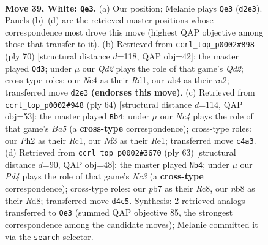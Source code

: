 \documentclass[11pt]{article}
\begin{document}
\clearpage

\begin{figure}[p]\centering
\begin{subfigure}{0.46\textwidth}\centering
\resizebox{\linewidth}{!}{%
\newchessgame
\chessboard[
  setfen={rnbr1q2/1p4k1/4p3/p1p2p1p/PnNP1P2/1P3NP1/3QB1KP/3R3R w - - 1 39},
  showmover=false,
  pgfstyle=straightmove, color=movearrow, markmove={d2-e3}
]}
\caption{}
\end{subfigure}\hfill
\begin{subfigure}{0.46\textwidth}\centering
\resizebox{\linewidth}{!}{%
\newchessgame
\chessboard[
  setfen={r5k1/2qn1pp1/1pb1p2p/2pP4/2P5/4PNP1/r2QBPP1/3RR1K1 w - - 11 36},
  showmover=false,
  pgfstyle=straightmove, color=movearrow, markmove={d2-d3}
]}
\caption{}
\end{subfigure}
\\[4pt]
\begin{subfigure}{0.46\textwidth}\centering
\resizebox{\linewidth}{!}{%
\newchessgame
\chessboard[
  setfen={4r1k1/1q1nbpp1/p3p2p/Bpr5/2P5/1P3N1P/P3QPP1/2R1R1K1 w - - 0 33},
  showmover=false,
  pgfstyle=straightmove, color=movearrow, markmove={a5-b4}
]}
\caption{}
\end{subfigure}\hfill
\begin{subfigure}{0.46\textwidth}\centering
\resizebox{\linewidth}{!}{%
\newchessgame
\chessboard[
  setfen={2rr2k1/1b2qpp1/1pn1p2p/pN1p4/P2P3P/4P1P1/1P3P2/1RRQ1BK1 b - - 1 32},
  showmover=false,
  pgfstyle=straightmove, color=movearrow, markmove={c6-b4}
]}
\caption{}
\end{subfigure}
\caption{\textbf{Move 39, White: \texttt{Qe3}.} (a) Our position; Melanie plays \texttt{Qe3} (\texttt{d2e3}). Panels (b)--(d) are the retrieved master positions whose correspondence most drove this move (highest QAP objective among those that transfer to it). (b) Retrieved from \texttt{ccrl\_top\_p0002\#898} (ply 70) [structural distance $d$=118, QAP obj=42]: the master played \texttt{Qd3}; under $\mu$ our \emph{Qd2} plays the role of that game's \emph{Qd2}; cross-type roles: our \emph{N}c4 as their \emph{R}d1, our \emph{n}b4 as their \emph{r}a2; transferred move \texttt{d2e3} \textbf{(endorses this move)}. (c) Retrieved from \texttt{ccrl\_top\_p0002\#948} (ply 64) [structural distance $d$=114, QAP obj=53]: the master played \texttt{Bb4}; under $\mu$ our \emph{Nc4} plays the role of that game's \emph{Ba5} (a \textbf{cross-type} correspondence); cross-type roles: our \emph{P}h2 as their \emph{R}c1, our \emph{N}f3 as their \emph{R}e1; transferred move \texttt{c4a3}. (d) Retrieved from \texttt{ccrl\_top\_p0002\#3670} (ply 63) [structural distance $d$=90, QAP obj=48]: the master played \texttt{Nb4}; under $\mu$ our \emph{Pd4} plays the role of that game's \emph{Nc3} (a \textbf{cross-type} correspondence); cross-type roles: our \emph{p}b7 as their \emph{R}c8, our \emph{n}b8 as their \emph{R}d8; transferred move \texttt{d4c5}. Synthesis: 2 retrieved analogs transferred to \texttt{Qe3} (summed QAP objective 85, the strongest correspondence among the candidate moves); Melanie committed it via the \texttt{search} selector.}
\label{fig:thought-m76}
\end{figure}
\end{document}
